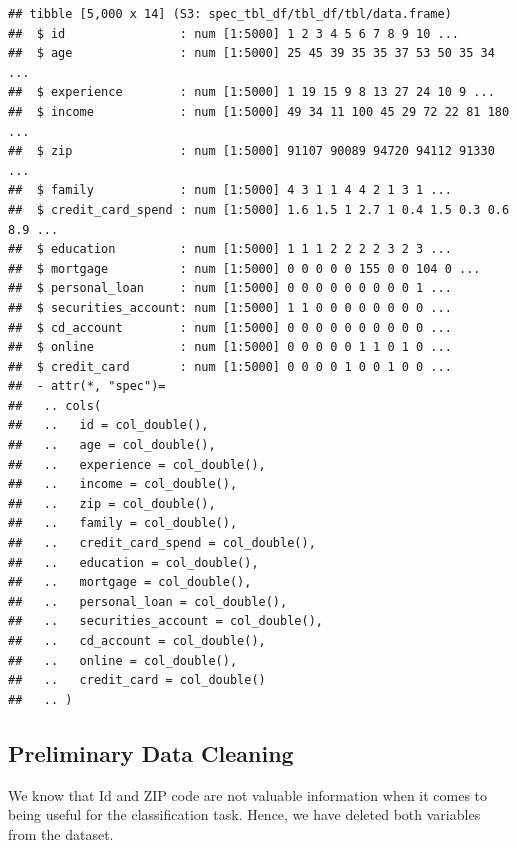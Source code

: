 \documentclass[
]{article}
\newenvironment{Shaded}{\begin{snugshade}}{\end{snugshade}}
\newcommand{\CommentTok}[1]{\textcolor[rgb]{0.00,0.40,1.00}{\textbf{\textit{#1}}}}
\newcommand{\NormalTok}[1]{\textcolor[rgb]{0.74,0.68,0.62}{#1}}
\newcommand{\OperatorTok}[1]{\textcolor[rgb]{0.74,0.68,0.62}{#1}}
\newcommand{\OtherTok}[1]{\textcolor[rgb]{0.74,0.68,0.62}{#1}}
\newcommand{\StringTok}[1]{\textcolor[rgb]{0.02,0.61,0.04}{#1}}
\begin{document}
\begin{verbatim}
## tibble [5,000 x 14] (S3: spec_tbl_df/tbl_df/tbl/data.frame)
##  $ id                : num [1:5000] 1 2 3 4 5 6 7 8 9 10 ...
##  $ age               : num [1:5000] 25 45 39 35 35 37 53 50 35 34 ...
##  $ experience        : num [1:5000] 1 19 15 9 8 13 27 24 10 9 ...
##  $ income            : num [1:5000] 49 34 11 100 45 29 72 22 81 180 ...
##  $ zip               : num [1:5000] 91107 90089 94720 94112 91330 ...
##  $ family            : num [1:5000] 4 3 1 1 4 4 2 1 3 1 ...
##  $ credit_card_spend : num [1:5000] 1.6 1.5 1 2.7 1 0.4 1.5 0.3 0.6 8.9 ...
##  $ education         : num [1:5000] 1 1 1 2 2 2 2 3 2 3 ...
##  $ mortgage          : num [1:5000] 0 0 0 0 0 155 0 0 104 0 ...
##  $ personal_loan     : num [1:5000] 0 0 0 0 0 0 0 0 0 1 ...
##  $ securities_account: num [1:5000] 1 1 0 0 0 0 0 0 0 0 ...
##  $ cd_account        : num [1:5000] 0 0 0 0 0 0 0 0 0 0 ...
##  $ online            : num [1:5000] 0 0 0 0 0 1 1 0 1 0 ...
##  $ credit_card       : num [1:5000] 0 0 0 0 1 0 0 1 0 0 ...
##  - attr(*, "spec")=
##   .. cols(
##   ..   id = col_double(),
##   ..   age = col_double(),
##   ..   experience = col_double(),
##   ..   income = col_double(),
##   ..   zip = col_double(),
##   ..   family = col_double(),
##   ..   credit_card_spend = col_double(),
##   ..   education = col_double(),
##   ..   mortgage = col_double(),
##   ..   personal_loan = col_double(),
##   ..   securities_account = col_double(),
##   ..   cd_account = col_double(),
##   ..   online = col_double(),
##   ..   credit_card = col_double()
##   .. )
\end{verbatim}

\hypertarget{preliminary-data-cleaning}{%
\subsection{Preliminary Data Cleaning}\label{preliminary-data-cleaning}}

We know that Id and ZIP code are not valuable information when it comes
to being useful for the classification task. Hence, we have deleted both
variables from the dataset.

\begin{Shaded}
\end{Shaded}
\end{document}
